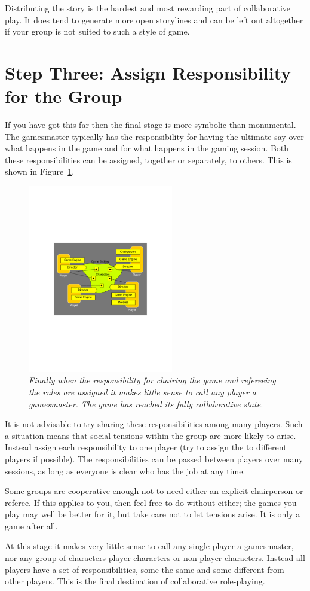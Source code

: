 \documentclass[twoside]{book}
\begin{document}
Distributing the story is the hardest and most rewarding part of collaborative play. It does tend to generate more open storylines and can be left out altogether if your group is not suited to such a style of game.

\section{Step Three: Assign Responsibility for the Group}

If you have got this far then the final stage is more symbolic than monumental. The gamesmaster typically has the responsibility for having the ultimate say over what happens in the game and for what happens in the gaming session. Both these responsibilities can be assigned, together or separately, to others. This is shown in Figure~\ref{fig-collab}.

\begin{figure}[htbp]
\centering
\includegraphics[width=2.5in]{collaborate_figure4}
\caption{\it Finally when the responsibility for chairing the game and refereeing the rules are assigned it makes little sense to call any player a gamesmaster. The game has reached its fully collaborative state.}
\label{fig-collab}
\end{figure}
It is not advisable to try sharing these responsibilities among many players. Such a situation means that social tensions within the group are more likely to arise. Instead assign each responsibility to one player (try to assign the to different players if possible). The responsibilities can be passed between players over many sessions, as long as everyone is clear who has the job at any time.

Some groups are cooperative enough not to need either an explicit chairperson or referee. If this applies to you, then feel free to do without either; the games you play may well be better for it, but take care not to let tensions arise. It is only a game after all.

At this stage it makes very little sense to call any single player a gamesmaster, nor any group of characters player characters or non-player characters. Instead all players have a set of responsibilities, some the same and some different from other players. This is the final destination of collaborative role-playing.
\end{document}
